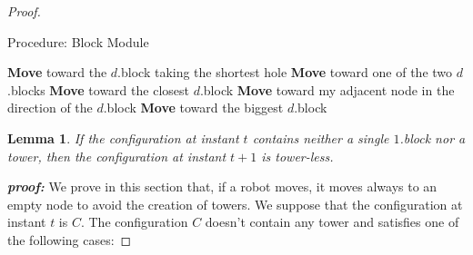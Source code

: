\documentclass[12pt]{llncs}
\newtheorem{lem}{Lemma}
\begin{document}
\begin{proof}
{\footnotesize
\begin{algorithm}[H]
  \caption{Procedure: Block Module}
  \label{ph1.algo}
 \begin{algorithmic}[1]
          \State \textbf{Move} toward the $d$.block taking the shortest hole
         \EndIf
    \Else
                \State \textbf{Move} toward one of the two $d$.blocks
             \EndIf
         \Else
             \State \textbf{Move} toward the closest $d$.block
          \EndIf
       \EndIf
     \EndIf
\Else {}
            \State \textbf{Move} toward my adjacent node in the direction of the $d$.block
         \EndIf
    \Else
              \State \textbf{Move} toward the biggest $d$.block   
          \EndIf
       \EndIf
     \EndIf
    \EndIf
  \end{algorithmic}
\end{algorithm} 
}
\begin{lem} If the configuration at instant $t$ contains neither a single $1$.block nor a tower, then the configuration at instant $t+1$ is tower-less.
\end{lem}

\textit{\textbf{proof:}} We prove in this section that, if a robot moves, it moves always to an empty node to avoid the creation of towers. We suppose that the configuration at instant $t$ is $C$. The configuration $C$ doesn't contain any tower and satisfies one of the following cases: 


\end{proof}
\end{document}
